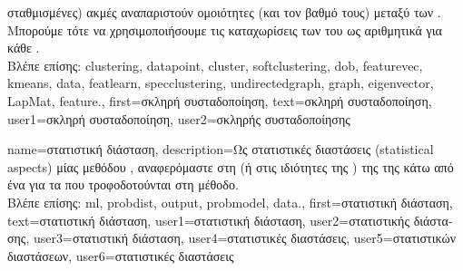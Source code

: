 {{{		σταθμισμένες) ακμές αναπαριστούν ομοιότητες (και τον βαθμό τους) μεταξύ των} . 
		\foreignlanguage{greek}{Μπορούμε τότε να χρησιμοποιήσουμε τις καταχωρίσεις των}  
		\foreignlanguage{greek}{του}  \foreignlanguage{greek}{ως αριθμητικά}  
		\foreignlanguage{greek}{για κάθε} .
		\\
		\foreignlanguage{greek}{Βλέπε επίσης:} \gls{clustering}, \gls{datapoint}, \gls{cluster}, \gls{softclustering}, \gls{dob}, \gls{featurevec}, \gls{kmeans}, 
		\gls{data}, \gls{featlearn}, \gls{specclustering}, \gls{undirectedgraph}, \gls{graph}, \gls{eigenvector}, \gls{LapMat}, \gls{feature}.},
	first={\foreignlanguage{greek}{σκληρή συσταδοποίηση}},
	text={\foreignlanguage{greek}{σκληρή συσταδοποίηση}},
	user1={\foreignlanguage{greek}{σκληρή συσταδοποίηση}}, %
	user2={\foreignlanguage{greek}{σκληρής συσταδοποί\-ησης}} %
}

{name={\foreignlanguage{greek}{στατιστική διάσταση}}, 
	description={\foreignlanguage{greek}{Ως στατιστικές διαστάσεις} (statistical aspects) 
		\foreignlanguage{greek}{μίας μεθόδου} , \foreignlanguage{greek}{αναφερόμαστε στη}  
		\foreignlanguage{greek}{(ή στις ιδιότητες της} ) \foreignlanguage{greek}{της}  
		\foreignlanguage{greek}{της κάτω από ένα}  \foreignlanguage{greek}{για τα}  
		\foreignlanguage{greek}{που τροφοδοτούνται στη μέθοδο.} 
		\\
		\foreignlanguage{greek}{Βλέπε επίσης:} \gls{ml}, \gls{probdist}, \gls{output}, \gls{probmodel}, \gls{data}.},
	first={\foreignlanguage{greek}{στατιστική διάσταση}},
	text={\foreignlanguage{greek}{στατιστική διάσταση}},
	user1={\foreignlanguage{greek}{στατιστική διάσταση}}, %
	user2={\foreignlanguage{greek}{στατιστικής διάστασης}}, %
	user3={\foreignlanguage{greek}{στατιστική διάσταση}}, %
	user4={\foreignlanguage{greek}{στατιστικές διαστάσεις}}, %
	user5={\foreignlanguage{greek}{στατιστικών διαστάσεων}}, %
	user6={\foreignlanguage{greek}{στατιστικές διαστάσεις}} %
}

